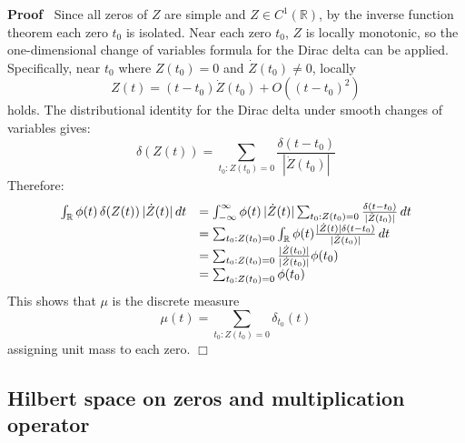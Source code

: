 \documentclass{article}
\newenvironment{proof}{\noindent\textbf{Proof\ }}{\hspace*{\fill}$\Box$\medskip}
\begin{document}
\begin{proof}
  Since all zeros of $Z$ are simple and $Z \in C^1 (\mathbb{R})$, by the
  inverse function theorem each zero $t_0$ is isolated. Near each zero $t_0$,
  $Z$ is locally monotonic, so the one-dimensional change of variables formula
  for the Dirac delta can be applied. Specifically, near $t_0$ where $Z (t_0)
  = 0$ and $\dot{Z} (t_0) \neq 0$, locally
  \begin{equation}
    Z (t) = (t - t_0)  \dot{Z} (t_0) + O ((t - t_0)^2)
  \end{equation}
  holds. The distributional identity for the Dirac delta under smooth changes
  of variables gives:
  \begin{equation}
    \delta (Z (t)) = \sum_{t_0 : Z (t_0) = 0} \frac{\delta (t - t_0)}{|
    \dot{Z} (t_0) |}
  \end{equation}
  Therefore:
  \begin{equation}
    \begin{array}{ll}
      \int_{\mathbb{R}} \phi (t)  \hspace{0.17em} \delta (Z (t))
      \hspace{0.17em} | \dot{Z} (t) |  \hspace{0.17em} dt & = \int_{-
      \infty}^{\infty} \phi (t) \hspace{0.17em} | \dot{Z} (t) |  \sum_{t_0 : Z
      (t_0) = 0} \frac{\delta (t - t_0)}{| \dot{Z} (t_0) |}  \hspace{0.17em}
      dt\\
      & = \sum_{t_0 : Z (t_0) = 0} \int_{\mathbb{R}} \phi (t) \frac{| \dot{Z}
      (t) | \delta (t - t_0)}{| \dot{Z} (t_0) |}  \hspace{0.17em} dt\\
      & = \sum_{t_0 : Z (t_0) = 0} \frac{| \dot{Z} (t_0) |}{| \dot{Z} (t_0)
      |} \phi (t_0)\\
      & = \sum_{t_0 : Z (t_0) = 0} \phi (t_0)
    \end{array}
  \end{equation}
  This shows that $\mu$ is the discrete measure
  \begin{equation}
    \mu (t) = \sum_{t_0 : Z (t_0) = 0} \delta_{t_0} (t)
  \end{equation}
  assigning unit mass to each zero.
\end{proof}

\subsection{Hilbert space on zeros and multiplication operator}
\end{document}
